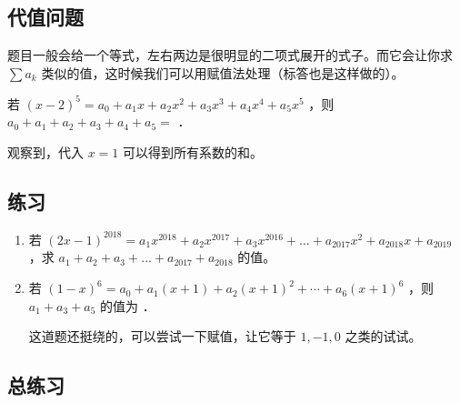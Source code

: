 \subsection{代值问题}

题目一般会给一个等式，左右两边是很明显的二项式展开的式子。而它会让你求 $\sum a_k$ 类似的值，这时候我们可以用赋值法处理（标答也是这样做的）。

\begin{example}
    若 $(x-2)^{5}=a_{0}+a_{1} x+a_{2} x^{2}+a_{3} x^{3}+a_{4} x^{4}+a_{5} x^{5}$ ，则 $a_{0}+a_{1}+a_{2}+a_{3}+a_{4}+a_{5}=$ \underline{\hspace{2cm}} ．

\end{example}

\begin{solution}
    观察到，代入 $x = 1$ 可以得到所有系数的和。
\end{solution}

\subsection*{练习}

\begin{enumerate}

    \item 若 $(2x-1)^{2018} = a_1 x^{2018} + a_2 x^{2017} + a_3 x^{2016} + \dots + a_{2017} x^2 + a_{2018} x + a_{2019}$ ，求 $a_1 + a_2 + a_3 + \dots + a_{2017} + a_{2018}$ 的值。

    \item
          若 $(1-x)^{6}=a_{0}+a_{1}(x+1)+a_{2}(x+1)^{2}+\cdots+a_{6}(x+1)^{6}$ ，则 $a_{1}+a_{3}+a_{5}$ 的值为 \underline{\hspace{2cm}} ．

          \begin{remark}
              这道题还挺绕的，可以尝试一下赋值，让它等于 $1,-1,0$ 之类的试试。
          \end{remark}

          \begin{note}
              \vspace{2cm}
          \end{note}
\end{enumerate}

\subsection{总练习}

